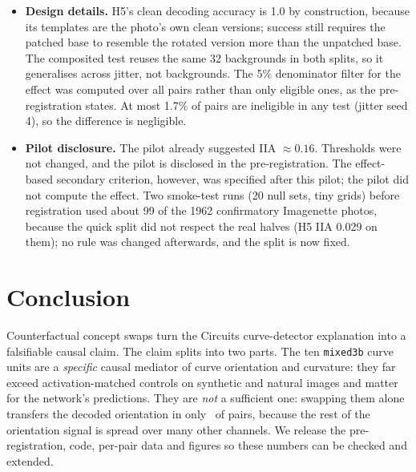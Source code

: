 \documentclass[11pt]{article}
\begin{document}
\begin{itemize}
\item \textbf{Design details.} H5's clean decoding accuracy is 1.0 by construction, because its templates are the photo's own clean versions; success still requires the patched base to resemble the rotated version more than the unpatched base. The composited test reuses the same 32 backgrounds in both splits, so it generalises across jitter, not backgrounds. The 5\% denominator filter for the effect was computed over all pairs rather than only eligible ones, as the pre-registration states. At most 1.7\% of pairs are ineligible in any test (jitter seed 4), so the difference is negligible.
\item \textbf{Pilot disclosure.} The pilot already suggested IIA $\approx0.16$. Thresholds were not changed, and the pilot is disclosed in the pre-registration. The effect-based secondary criterion, however, was specified after this pilot; the pilot did not compute the effect. Two smoke-test runs (20 null sets, tiny grids) before registration used about 99 of the 1962 confirmatory Imagenette photos, because the quick split did not respect the real halves (H5 IIA 0.029 on them); no rule was changed afterwards, and the split is now fixed.
\end{itemize}

\section{Conclusion}
Counterfactual concept swaps turn the Circuits curve-detector explanation into a falsifiable causal claim. The claim splits into two parts. The ten \texttt{mixed3b} curve units are a \emph{specific} causal mediator of curve orientation and curvature: they far exceed activation-matched controls on synthetic and natural images and matter for the network's predictions. They are \emph{not} a sufficient one: swapping them alone transfers the decoded orientation in only \HOneIIA\ of pairs, because the rest of the orientation signal is spread over many other channels. We release the pre-registration, code, per-pair data and figures so these numbers can be checked and extended.
\end{document}
